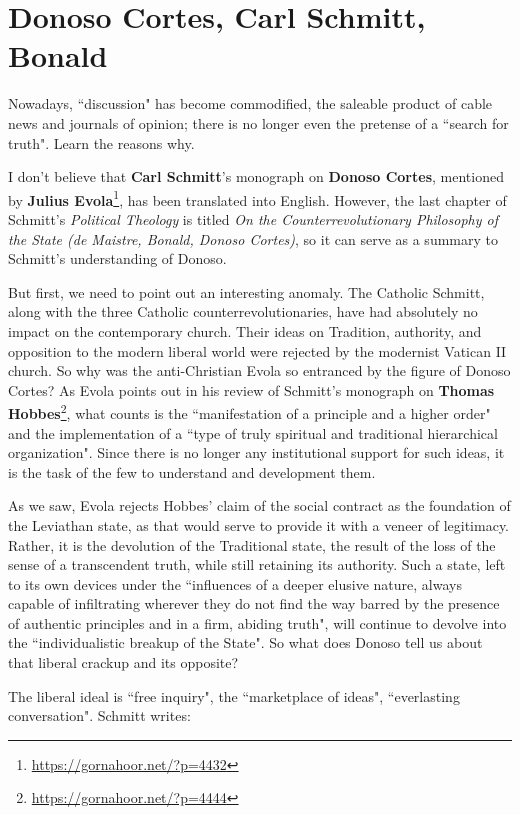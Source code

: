 \section{Donoso Cortes, Carl Schmitt, Bonald}

Nowadays, ``discussion" has become commodified, the saleable product of cable news and journals of opinion; there is no longer even the pretense of a ``search for truth". Learn the reasons why.

I don't believe that \textbf{Carl Schmitt}'s monograph on \textbf{Donoso Cortes}, mentioned by \textbf{Julius Evola}\footnote{\url{https://gornahoor.net/?p=4432}}, has been translated into English. However, the last chapter of Schmitt's \textit{Political Theology} is titled \textit{On the Counterrevolutionary Philosophy of the State (de Maistre, Bonald, Donoso Cortes)}, so it can serve as a summary to Schmitt's understanding of Donoso.

But first, we need to point out an interesting anomaly. The Catholic Schmitt, along with the three Catholic counterrevolutionaries, have had absolutely no impact on the contemporary church. Their ideas on Tradition, authority, and opposition to the modern liberal world were rejected by the modernist Vatican II church. So why was the anti-Christian Evola so entranced by the figure of Donoso Cortes? As Evola points out in his review of Schmitt's monograph on \textbf{Thomas Hobbes}\footnote{\url{https://gornahoor.net/?p=4444}}, what counts is the ``manifestation of a principle and a higher order" and the implementation of a ``type of truly spiritual and traditional hierarchical organization". Since there is no longer any institutional support for such ideas, it is the task of the few to understand and development them.

As we saw, Evola rejects Hobbes' claim of the social contract as the foundation of the Leviathan state, as that would serve to provide it with a veneer of legitimacy. Rather, it is the devolution of the Traditional state, the result of the loss of the sense of a transcendent truth, while still retaining its authority. Such a state, left to its own devices under the ``influences of a deeper elusive nature, always capable of infiltrating wherever they do not find the way barred by the presence of authentic principles and in a firm, abiding truth", will continue to devolve into the ``individualistic breakup of the State". So what does Donoso tell us about that liberal crackup and its opposite?

The liberal ideal is ``free inquiry", the ``marketplace of ideas", ``everlasting conversation". Schmitt writes:

